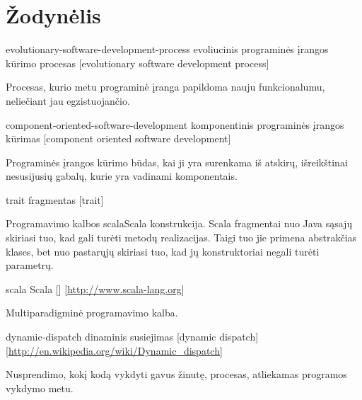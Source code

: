 \chapter{Žodynėlis}

\begin{glossary}

  \begin{entry}%
    {evolutionary-software-development-process}%
    {evoliucinis programinės įrangos kūrimo procesas}%
    [evolutionary software development process]

    Procesas, kurio metu programinė įranga papildoma nauju funkcionalumu,
    neliečiant jau egzistuojančio.
    
  \end{entry}

  \begin{entry}%
    {component-oriented-software-development}%
    {komponentinis programinės įrangos kūrimas}%
    [component oriented software development]

    Programinės įrangos kūrimo būdas, kai ji yra surenkama iš atskirų,
    išreikštinai nesusijusių gabalų, kurie yra vadinami komponentais.
    
  \end{entry}

  \begin{entry}%
    {trait}%
    {fragmentas}%
    [trait]

    Programavimo kalbos \gls{scala}{Scala} konstrukcija. Scala
    fragmentai nuo Java sąsajų skiriasi tuo, kad gali turėti metodų
    realizacijas. Taigi tuo jie primena abstrakčias klases, bet nuo
    pastarųjų skiriasi tuo, kad jų konstruktoriai negali turėti
    parametrų.
  
  \end{entry}

  \begin{entry}%
    {scala}%
    {Scala}%
    []%
    [\url{http://www.scala-lang.org}]

    Multiparadigminė programavimo kalba.
    
  \end{entry}


  \begin{entry}%
    {dynamic-dispatch}%
    {dinaminis susiejimas}%
    [dynamic dispatch]%
    [\url{http://en.wikipedia.org/wiki/Dynamic_dispatch}]

    Nusprendimo, kokį kodą vykdyti gavus žinutę, procesas,
    atliekamas programos vykdymo metu.


\end{entry}
\end{glossary}
